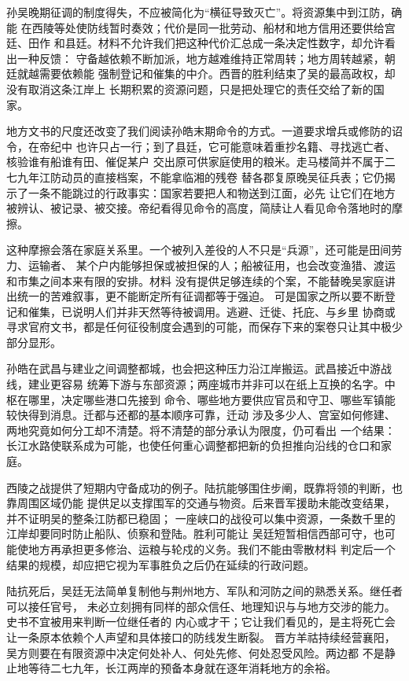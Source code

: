 孙吴晚期征调的制度得失，不应被简化为“横征导致灭亡”。将资源集中到江防，确能
在西陵等处使防线暂时奏效；代价是同一批劳动、船材和地方信用还要供给宫廷、田作
和县廷。材料不允许我们把这种代价汇总成一条决定性数字，却允许看出一种反馈：
守备越依赖不断加派，地方越难维持正常周转；地方周转越紧，朝廷就越需要依赖能
强制登记和催集的中介。西晋的胜利结束了吴的最高政权，却没有取消这条江岸上
长期积累的资源问题，只是把处理它的责任交给了新的国家。

地方文书的尺度还改变了我们阅读孙皓末期命令的方式。一道要求增兵或修防的诏令，在帝纪中
也许只占一行；到了县廷，它可能意味着重抄名籍、寻找逃亡者、核验谁有船谁有田、催促某户
交出原可供家庭使用的粮米。走马楼简并不属于二七九年江防动员的直接档案，不能拿临湘的残卷
替各郡复原晚吴征兵表；它仍揭示了一条不能跳过的行政事实：国家若要把人和物送到江面，必先
让它们在地方被辨认、被记录、被交接。帝纪看得见命令的高度，简牍让人看见命令落地时的摩擦。

这种摩擦会落在家庭关系里。一个被列入差役的人不只是“兵源”，还可能是田间劳力、运输者、
某个户内能够担保或被担保的人；船被征用，也会改变渔猎、渡运和市集之间本来有限的安排。材料
没有提供足够连续的个案，不能替晚吴家庭讲出统一的苦难叙事，更不能断定所有征调都等于强迫。
可是国家之所以要不断登记和催集，已说明人们并非天然等待被调用。逃避、迁徙、托庇、与乡里
协商或寻求官府文书，都是任何征役制度会遇到的可能，而保存下来的案卷只让其中极少部分显形。

孙皓在武昌与建业之间调整都城，也会把这种压力沿江岸搬运。武昌接近中游战线，建业更容易
统筹下游与东部资源；两座城市并非可以在纸上互换的名字。中枢在哪里，决定哪些港口先接到
命令、哪些地方要供应官员和守卫、哪些军镇能较快得到消息。迁都与还都的基本顺序可靠，迁动
涉及多少人、宫室如何修建、两地究竟如何分工却不清楚。将不清楚的部分承认为限度，仍可看出
一个结果：长江水路使联系成为可能，也使任何重心调整都把新的负担推向沿线的仓口和家庭。

西陵之战提供了短期内守备成功的例子。陆抗能够围住步阐，既靠将领的判断，也靠周围区域仍能
提供足以支撑围军的交通与物资。后来晋军援助未能改变结果，并不证明吴的整条江防都已稳固；
一座峡口的战役可以集中资源，一条数千里的江岸却要同时防止船队、侦察和登陆。胜利可能让
吴廷短暂相信西部可守，也可能使地方再承担更多修治、运粮与轮戍的义务。我们不能由零散材料
判定后一个结果的规模，却应把它视为军事胜负之后仍在延续的行政问题。

陆抗死后，吴廷无法简单复制他与荆州地方、军队和河防之间的熟悉关系。继任者可以接任官号，
未必立刻拥有同样的部众信任、地理知识与与地方交涉的能力。史书不宜被用来判断一位继任者的
内心或才干；它让我们看见的，是主将死亡会让一条原本依赖个人声望和具体接口的防线发生断裂。
晋方羊祜持续经营襄阳，吴方则要在有限资源中决定何处补人、何处先修、何处忍受风险。两边都
不是静止地等待二七九年，长江两岸的预备本身就在逐年消耗地方的余裕。

